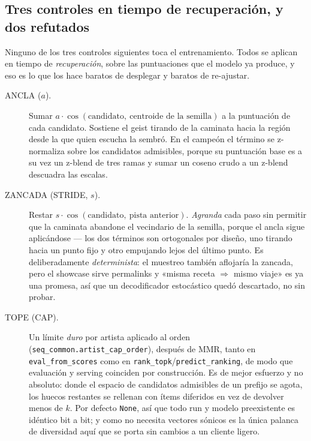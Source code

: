 \documentclass[11pt]{article}
\begin{document}
\subsection{Tres controles en tiempo de recuperación, y dos refutados}
\label{sec:walk-controls}
Ninguno de los tres controles siguientes toca el entrenamiento. Todos se aplican
en tiempo de \emph{recuperación}, sobre las puntuaciones que el modelo ya
produce, y eso es lo que los hace baratos de desplegar y baratos de re-ajustar.

\begin{description}
  \item[ANCLA ($a$).] Sumar $a\cdot\cos(\text{candidato},\ \text{centroide de la
  semilla})$ a la puntuación de cada candidato. Sostiene el geist tirando de la
  caminata hacia la región desde la que quien escucha la sembró. En el campeón
  el término se z-normaliza sobre los candidatos admisibles, porque su
  puntuación base es a su vez un z-blend de tres ramas y sumar un coseno crudo a
  un z-blend descuadra las escalas.
  \item[ZANCADA (STRIDE, $s$).] Restar $s\cdot\cos(\text{candidato},\
  \text{pista anterior})$. \emph{Agranda} cada paso sin permitir que la caminata
  abandone el vecindario de la semilla, porque el ancla sigue aplicándose --- los
  dos términos son ortogonales por diseño, uno tirando hacia un punto fijo y
  otro empujando lejos del último punto. Es deliberadamente
  \emph{determinista}: el muestreo también aflojaría la zancada, pero el
  showcase sirve permalinks y «misma receta $\Rightarrow$ mismo viaje» es ya una
  promesa, así que un decodificador estocástico quedó descartado, no sin probar.
  \item[TOPE (CAP).] Un límite \emph{duro} por artista aplicado al orden
  (\texttt{seq\_common.artist\_cap\_order}), después de MMR, tanto en
  \texttt{eval\_from\_scores} como en
  \texttt{rank\_topk}/\texttt{predict\_ranking}, de modo que evaluación y
  serving coinciden por construcción. Es de mejor esfuerzo y no absoluto: donde
  el espacio de candidatos admisibles de un prefijo se agota, los huecos
  restantes se rellenan con ítems diferidos en vez de devolver menos de $k$. Por
  defecto \texttt{None}, así que todo run y modelo preexistente es idéntico bit
  a bit; y como no necesita vectores sónicos es la única palanca de diversidad
  aquí que se porta sin cambios a un cliente ligero.
\end{description}
\end{document}
